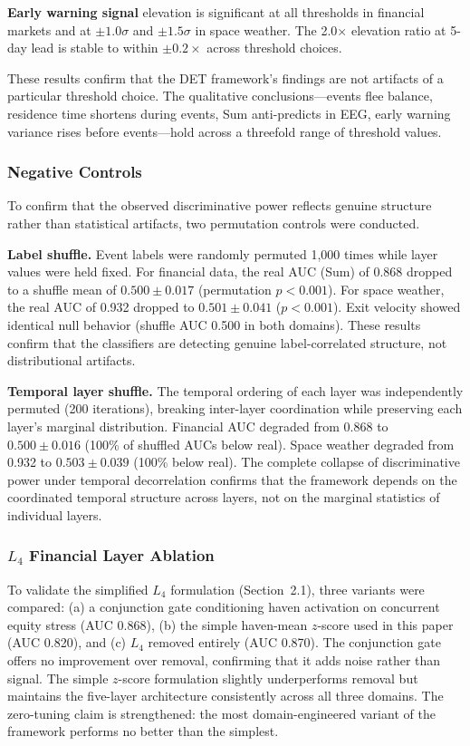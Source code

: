 \documentclass[aip,cha,reprint,amsmath,amssymb,final]{revtex4-2}
\begin{document}
\textbf{Early warning signal} elevation is significant at all thresholds in financial markets and at $\pm 1.0\sigma$ and $\pm 1.5\sigma$ in space weather. The 2.0$\times$ elevation ratio at 5-day lead is stable to within $\pm 0.2\times$ across threshold choices.

These results confirm that the DET framework's findings are not artifacts of a particular threshold choice. The qualitative conclusions---events flee balance, residence time shortens during events, Sum anti-predicts in EEG, early warning variance rises before events---hold across a threefold range of threshold values.

\subsubsection{Negative Controls}

To confirm that the observed discriminative power reflects genuine structure rather than statistical artifacts, two permutation controls were conducted.

\textbf{Label shuffle.} Event labels were randomly permuted 1,000 times while layer values were held fixed. For financial data, the real AUC (Sum) of 0.868 dropped to a shuffle mean of $0.500 \pm 0.017$ (permutation $p < 0.001$). For space weather, the real AUC of 0.932 dropped to $0.501 \pm 0.041$ ($p < 0.001$). Exit velocity showed identical null behavior (shuffle AUC 0.500 in both domains). These results confirm that the classifiers are detecting genuine label-correlated structure, not distributional artifacts.

\textbf{Temporal layer shuffle.} The temporal ordering of each layer was independently permuted (200 iterations), breaking inter-layer coordination while preserving each layer's marginal distribution. Financial AUC degraded from 0.868 to $0.500 \pm 0.016$ (100\% of shuffled AUCs below real). Space weather degraded from 0.932 to $0.503 \pm 0.039$ (100\% below real). The complete collapse of discriminative power under temporal decorrelation confirms that the framework depends on the coordinated temporal structure across layers, not on the marginal statistics of individual layers.

\subsubsection{\label{sec:l4ablation}$L_4$ Financial Layer Ablation}

To validate the simplified $L_4$ formulation (Section~2.1), three variants were compared: (a) a conjunction gate conditioning haven activation on concurrent equity stress (AUC 0.868), (b) the simple haven-mean $z$-score used in this paper (AUC 0.820), and (c) $L_4$ removed entirely (AUC 0.870). The conjunction gate offers no improvement over removal, confirming that it adds noise rather than signal. The simple $z$-score formulation slightly underperforms removal but maintains the five-layer architecture consistently across all three domains. The zero-tuning claim is strengthened: the most domain-engineered variant of the framework performs no better than the simplest.
\end{document}
